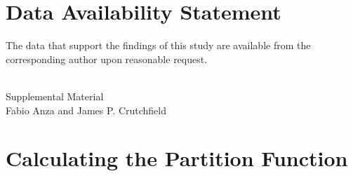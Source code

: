 \documentclass[draft,nofootinbib,pre,twocolumn,showpacs,showkeys,groupaddress,preprintnumbers,floatfix]{revtex4-1}
\newcommand{\1}{\mathbbm{1}}
\begin{document}
\section*{Data Availability Statement}
The data that support the findings of this study are available from the
corresponding author upon reasonable request.



\makeatletter
\newcommand{\manuallabel}[2]{\def\@currentlabel{#2}\label{#1}}
\makeatother

\manuallabel{sm:ETHs}{Section~A}
\manuallabel{sm:proof}{Section~B}
\manuallabel{sm:generalizedbloch}{Subsection~B1}
\manuallabel{sm:proofofmaintheorem}{Subsection~B2}
\manuallabel{sm:examples}{Section~C}

\clearpage
\appendix
\onecolumngrid


\pagestyle{empty}

\begin{center}
{\Large {\bf \ourTitle}\\[0.5cm]
Supplemental Material}\\[0.2cm]
Fabio Anza and James P. Crutchfield
\end{center}

\section{Calculating the Partition Function}
\label{App:DetailedCalculation}
\end{document}
